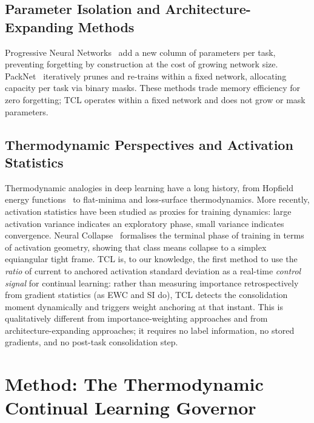 \documentclass[10pt,a4paper]{article}
\begin{document}
\subsection{Parameter Isolation and Architecture-Expanding Methods}

Progressive Neural Networks~\cite{Rusu2016} add a new column of parameters per task,
preventing forgetting by construction at the cost of growing network size.
PackNet~\cite{Mallya2018} iteratively prunes and re-trains within a fixed network,
allocating capacity per task via binary masks.
These methods trade memory efficiency for zero forgetting; TCL operates within a
fixed network and does not grow or mask parameters.

\subsection{Thermodynamic Perspectives and Activation Statistics}

Thermodynamic analogies in deep learning have a long history, from Hopfield energy
functions~\cite{Hopfield1982} to flat-minima and loss-surface thermodynamics.
More recently, activation statistics have been studied as proxies for training
dynamics: large activation variance indicates an exploratory phase, small variance
indicates convergence.
Neural Collapse~\cite{Papyan2020} formalises the terminal phase of training in terms
of activation geometry, showing that class means collapse to a simplex equiangular
tight frame.
TCL is, to our knowledge, the first method to use the \emph{ratio} of current to
anchored activation standard deviation as a real-time \emph{control signal} for
continual learning: rather than measuring importance retrospectively from gradient
statistics (as EWC and SI do), TCL detects the consolidation moment dynamically
and triggers weight anchoring at that instant.
This is qualitatively different from importance-weighting approaches and from
architecture-expanding approaches; it requires no label information, no stored
gradients, and no post-task consolidation step.



\section{Method: The Thermodynamic Continual Learning Governor}
\label{sec:method}
\end{document}
